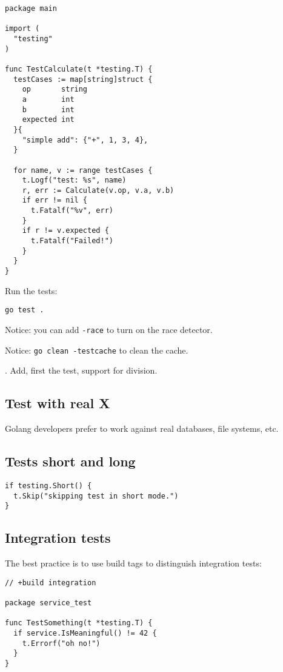 \documentclass[11pt, letterpaper]{article}
\begin{document}
\begin{verbatim}
package main

import (
  "testing"
)

func TestCalculate(t *testing.T) {
  testCases := map[string]struct {
    op       string
    a        int
    b        int
    expected int
  }{
    "simple add": {"+", 1, 3, 4},
  }

  for name, v := range testCases {
    t.Logf("test: %s", name)
    r, err := Calculate(v.op, v.a, v.b)
    if err != nil {
      t.Fatalf("%v", err)
    }
    if r != v.expected {
      t.Fatalf("Failed!")
    }
  }
}
\end{verbatim}

Run the tests:

\begin{verbatim}
go test .
\end{verbatim}

Notice: you can add \verb|-race| to turn on the race detector.

Notice: \verb|go clean -testcache| to clean the cache.

. Add, first the test, support for division.

\subsection{Test with real X}

Golang developers prefer to work against real databases, file systems, etc.

\subsection{Tests short and long}

\begin{verbatim}
if testing.Short() {
  t.Skip("skipping test in short mode.")
}
\end{verbatim}

\subsection{Integration tests}

The best practice is to use build tags to distinguish integration tests:

\begin{verbatim}
// +build integration

package service_test

func TestSomething(t *testing.T) {
  if service.IsMeaningful() != 42 {
    t.Errorf("oh no!")
  }
}
\end{verbatim}
\end{document}
